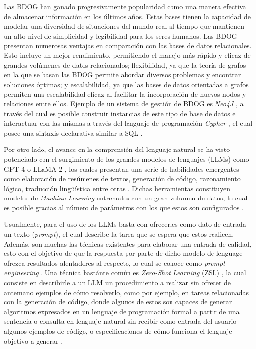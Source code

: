 Las BDOG han ganado progresivamente popularidad como una manera efectiva de almacenar información en los últimos años. Estas bases tienen la capacidad de modelar una diversidad de situaciones del mundo real al tiempo que mantienen un alto nivel de simplicidad y legibilidad para los seres humanos. Las BDOG presentan numerosas ventajas en comparación con las bases de datos relacionales. Esto incluye un mejor rendimiento, permitiendo el manejo más rápido y eficaz de grandes volúmenes de datos relacionados; flexibilidad, ya que la teoría de grafos en la que se basan las BDOG permite abordar diversos problemas y encontrar soluciones óptimas; y escalabilidad, ya que las bases de datos orientadas a grafos permiten una escalabilidad eficaz al facilitar la incorporación de nuevos nodos y relaciones entre ellos. Ejemplo de un sistema de gestión de BDOG es \textit{Neo4J} \cite{neo4j}, a través del cual es posible construir instancias de este tipo de base de datos e interactuar con las mismas a través del lenguaje de programación \textit{Cypher} \cite{cypher}, el cual posee una sintaxis declarativa similar a SQL \cite{sqllang}.

Por otro lado, el avance en la comprensión del lenguaje natural se ha visto potenciado con el surgimiento de los grandes modelos de lenguajes (LLMs) \cite{llms} como GPT-4 \cite{gpt4} o LLaMA-2 \cite{llama2}, los cuales presentan una serie de habilidades emergentes como elaboración de resúmenes de textos, generación de código, razonamiento lógico, traducción lingüística entre otras \cite{llmsskills}. Dichas herramientas constituyen modelos de \textit{Machine Learning} entrenados con un gran volumen de datos, lo cual es posible gracias al número de parámetros con los que estos son configurados \cite{llmsparams}. 

Usualmente, para el uso de los LLMs basta con ofrecerles como dato de entrada un texto (\textit{prompt}), el cual describe la tarea que se espera que estos realicen. Además, son muchas las técnicas existentes para elaborar una entrada de calidad, esto con el objetivo de que la respuesta por parte de dicho modelo de lenguage ofrezca resultados alentadores al respecto, lo cual se conoce como \textit{prompt engineering} \cite{prompengineering}. Una técnica bastánte común es \textit{Zero-Shot Learning} (ZSL) \cite{zeroshotlearning}, la cual consiste en describirle a un LLM un procedimiento a realizar sin ofrecer de antemano ejemplos de cómo resolverlo, como por ejemplo, en tareas relacionadas con la generación de código, donde algunos de estos son capaces de generar algoritmos expresados en un lenguaje de programación formal a partir de una sentencia o consulta en lenguaje natural sin recibir como entrada del usuario algunos ejemplos de código, o especificaciones de cómo funciona el lenguaje objetivo a generar \cite{tex2code1} \cite{text2code2}. 

